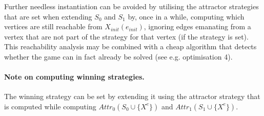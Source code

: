 \documentclass{article}
\begin{document}
Further needless instantiation can be avoided by utilising the attractor
strategies that are set when extending $S_0$ and $S_1$ by, once in a while, computing
which vertices are still reachable from $X_\textit{init}(e_\textit{init})$, ignoring
edges emanating from a vertex that are not part of the strategy for that vertex (if the
strategy is set). This reachability analysis may be combined with a cheap algorithm that
detects whether the game can in fact already be solved (see e.g. optimisation 4). 

\paragraph{Note on computing winning strategies.} The winning strategy can be set by extending
it using the attractor strategy that is computed while
computing $Attr_0(S_0 \cup \{X^e\})$ and $Attr_1(S_1 \cup \{X^e\})$.
\end{document}
